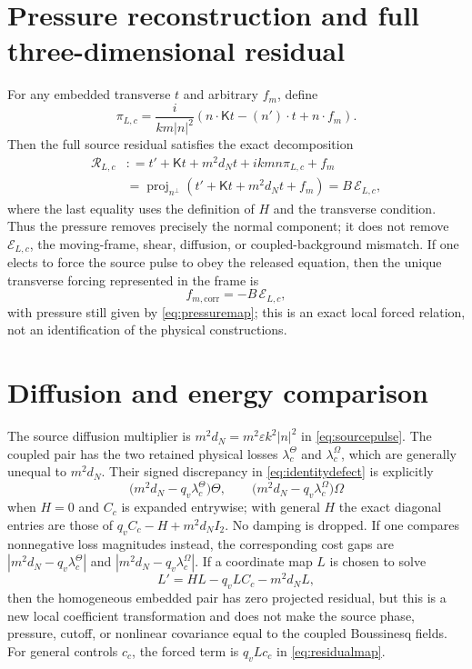 \documentclass[11pt]{article}
\newcommand{\proj}{\operatorname{proj}}
\begin{document}
\section{Pressure reconstruction and full three-dimensional residual}
For any embedded transverse $t$ and arbitrary $f_m$, define
\begin{equation}
 \pi_{L,c}=\frac{i}{km|n|^2}
 \left(n\cdot\mathsf Kt-(n')\cdot t+n\cdot f_m\right).
 \label{eq:pressuremap}
\end{equation}
Then the full source residual satisfies the exact decomposition
\begin{align}
 \mathcal R_{L,c}
 &: =t'+\mathsf Kt+m^2d_Nt+ikm n\pi_{L,c}+f_m \\
 &=\proj_{n^\perp}\left(t'+\mathsf Kt+m^2d_Nt+f_m\right)
 =B\,\mathcal E_{L,c},
 \label{eq:fullresidual}
\end{align}
where the last equality uses the definition of $H$ and the transverse condition.
Thus the pressure removes precisely the normal component; it does not remove
$\mathcal E_{L,c}$, the moving-frame, shear, diffusion, or coupled-background
mismatch.  If one elects to force the source pulse to obey the released equation,
then the unique transverse forcing represented in the frame is
\begin{equation}
 f_{m,\mathrm{corr}}=-B\,\mathcal E_{L,c},
\end{equation}
with pressure still given by \eqref{eq:pressuremap}; this is an exact local
forced relation, not an identification of the physical constructions.

\section{Diffusion and energy comparison}
The source diffusion multiplier is $m^2d_N=m^2\varepsilon k^2|n|^2$ in
\eqref{eq:sourcepulse}.  The coupled pair has the two retained physical losses
$\lambda_c^\Theta$ and $\lambda_c^\Omega$, which are generally unequal to
$m^2d_N$.  Their signed discrepancy in \eqref{eq:identitydefect} is explicitly
\begin{equation}
 \bigl(m^2d_N-q_v\lambda_c^\Theta\bigr)\Theta,
 \qquad
 \bigl(m^2d_N-q_v\lambda_c^\Omega\bigr)\Omega
\end{equation}
when $H=0$ and $C_c$ is expanded entrywise; with general $H$ the exact
diagonal entries are those of $q_vC_c-H+m^2d_NI_2$.  No damping is dropped.
If one compares nonnegative loss magnitudes instead, the corresponding cost
gaps are $|m^2d_N-q_v\lambda_c^\Theta|$ and
$|m^2d_N-q_v\lambda_c^\Omega|$.  If a coordinate map $L$ is chosen to solve
\begin{equation}
 L'=HL-q_vLC_c-m^2d_NL,
 \label{eq:intertwiner}
\end{equation}
then the homogeneous embedded pair has zero projected residual, but this is a
new local coefficient transformation and does not make the source phase,
pressure, cutoff, or nonlinear covariance equal to the coupled Boussinesq fields.
For general controls $c_c$, the forced term is $q_vLc_c$ in
\eqref{eq:residualmap}.
\end{document}
